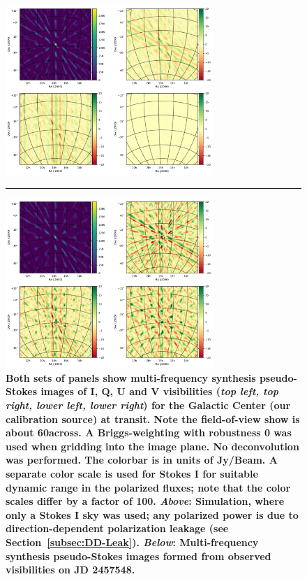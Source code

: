 \documentclass[twocolumn, trackchanges]{aastex61}
\newcommand{\edited}[1]{{\bf \color{red} #1}}
\begin{document}
\begin{figure}
\centering
\includegraphics[width=0.7\textwidth]{sim4pol_new.pdf}
\vspace{-0.1in}
\par\noindent\rule{0.8\textwidth}{0.4pt}
\includegraphics[width=0.7\textwidth]
{real4pol_new.pdf}
\caption{\edited{
Both sets of panels show multi-frequency synthesis pseudo-Stokes images of I, Q, U and V visibilities (\textit{top left, top right, lower left, lower right}) for the Galactic Center (our calibration source) at transit.  Note the field-of-view show is about 60\arcdeg across.
A Briggs-weighting with robustness 0 was used when gridding into the image plane. 
No deconvolution was performed. 
The colorbar is in units of Jy/Beam.
A separate color scale is used for Stokes I for suitable dynamic range in the polarized fluxes; note that the color scales differ by a factor of 100.
\textit{Above}:  Simulation, where only a Stokes I sky was used; any polarized power is due to direction-dependent polarization leakage (see Section~\ref{subsec:DD-Leak}).
\textit{Below}: Multi-frequency synthesis pseudo-Stokes images formed from observed visibilities on JD 2457548.
}
}
\label{fig:GCimage}
\end{figure}
\end{document}
